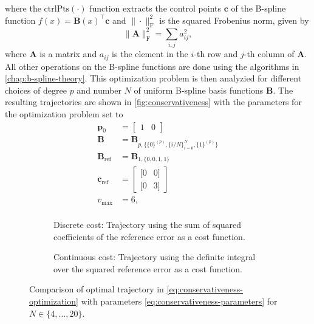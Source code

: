 where the $\text{ctrlPts}(\cdot)$ function extracts the control points $\mathbf c$ of the B-spline function $f(x)=\mathbf B(x)^\top\mathbf c$ and $\|\cdot\|_\text{F}^2$ is the squared Frobenius norm, given by
\begin{equation}
    \|\mathbf A\|_\text{F}^2 = \sum_{i,j} a_{ij}^2,
\end{equation}
where $\mathbf A$ is a matrix and $a_{ij}$ is the element in the $i$-th row and $j$-th column of $\mathbf A$. All other operations on the B-spline functions are done using the algorithms in \cref{chap:b-spline-theory}. 
This optimization problem is then analyzied for different choices of degree $p$ and number $N$ of uniform B-spline basis functions $\mathbf B$. The resulting trajectories are shown in \cref{fig:conservativeness} with the parameters for the optimization problem set to
\begin{equation}\label{eq:conservativeness-parameters}
    \begin{aligned}
        \mathbf p_0 &= \begin{bmatrix} 1 & 0 \end{bmatrix} \\
        \mathbf B &= \mathbf B_{p,
            \{
                \{0\}^{(p)}, \{i/N\}_{i=0}^{N}, \{1\}^{(p)}
            \}} \\
        \mathbf B_\text{ref} &= \mathbf B_{1,\{0, 0, 1, 1\}} \\
        \mathbf c_\text{ref} &= \begin{bmatrix}
            [0 & 0] \\
            [0 & 3]
        \end{bmatrix} \\
        v_\text{max} &= 6, \\
    \end{aligned}
\end{equation}


\begin{figure}
    \centering
    \begin{subfigure}[b]{\textwidth}
        \centering
        
        \caption{Discrete cost: Trajectory using the sum of squared coefficients of the reference error as a cost function.}
        \label{fig:conservativeness-traj-coeffs}
    \end{subfigure}
    \hfill
    \begin{subfigure}[b]{\textwidth}
        \centering
        
        \caption{Continuous cost: Trajectory using the definite integral over the squared reference error as a cost function.}
        \label{fig:conservativeness-traj-integral}
    \end{subfigure}
    \caption{Comparison of optimal trajectory in \cref{eq:conservativeness-optimization} with parameters \cref{eq:conservativeness-parameters} for $N\in\{4,\ldots,20\}$.}
    \label{fig:conservativeness-traj}
\end{figure}


